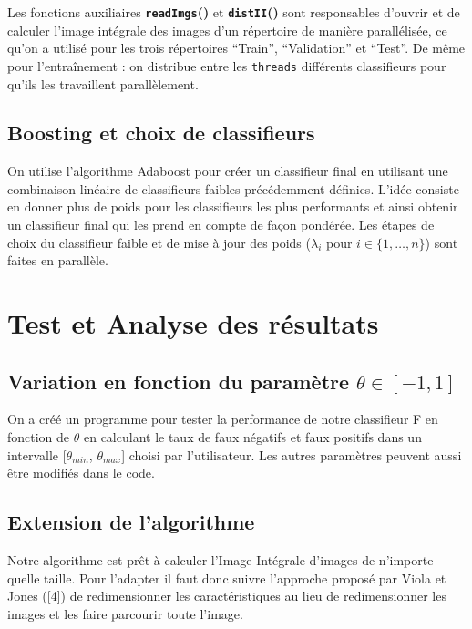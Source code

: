 \documentclass[a4paper, 12pt,twoside]{article}
\newcommand{\func}[1]{
\textbf{\texttt{#1}()}
}
\newcommand{\param}[1]{
\texttt{#1}
}
\begin{document}
	Les fonctions auxiliaires \func{readImgs} et \func{distII} sont responsables d’ouvrir et de calculer l’image intégrale des images d’un répertoire de manière parallélisée, ce qu’on a utilisé pour les trois répertoires “Train”, “Validation” et “Test”. De même pour l’entraînement : on distribue entre les \param{threads} différents classifieurs pour qu’ils les travaillent parallèlement.


\subsection{Boosting et choix de classifieurs}

	On utilise l’algorithme Adaboost pour créer un classifieur final en utilisant une combinaison linéaire de classifieurs faibles précédemment définies. L’idée consiste en donner plus de poids pour les classifieurs les plus performants et ainsi obtenir un classifieur final qui les prend en compte de façon pondérée. Les étapes de choix du classifieur faible et de mise à jour des poids ($\lambda_i $ pour $ i \in \{1, \ldots, n\}$) sont faites en parallèle.

\clearpage


\section{Test et Analyse des résultats}

\subsection{Variation en fonction du paramètre $\theta \in [-1,1]$}

	On a créé un programme pour tester la performance de notre classifieur F en fonction de $\theta$ en calculant le taux de faux négatifs et faux positifs dans un intervalle [$\theta_{min}$, $\theta_{max}$] choisi par l'utilisateur. Les autres paramètres peuvent aussi être modifiés dans le code.

\subsection{Extension de l’algorithme}

	Notre algorithme est prêt à calculer l'Image Intégrale d'images de n'importe quelle taille. Pour l'adapter il faut donc suivre l'approche proposé par Viola et Jones ([4]) de redimensionner les caractéristiques au lieu de redimensionner les images et les faire parcourir toute l'image.
\clearpage
 
\end{document}
